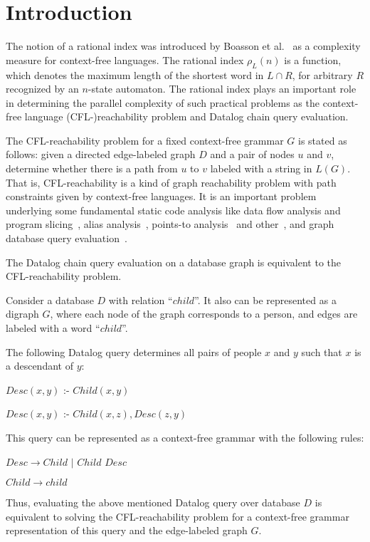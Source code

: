 \documentclass{ws-ijfcs}
\begin{document}

\section{Introduction}
\label{intro}
The notion of a rational index was introduced by Boasson et al.~\cite{RatBasic} as a complexity measure for context-free languages.  The rational index $\rho_L(n)$ is a function, which denotes the maximum length of the shortest word in $L \cap R$, for arbitrary $R$ recognized by an $n$-state automaton. The rational index plays an important role in determining the parallel complexity of such practical problems as the context-free language (CFL-)reachability problem and Datalog chain query evaluation.

The CFL-reachability problem for a fixed context-free grammar $G$ is stated as follows: given a directed edge-labeled graph $D$ and a pair of nodes  $u$ and $v$, determine whether there is a path from $u$ to $v$ labeled with a string in $L(G)$.  That is, CFL-reachability is a kind of graph reachability problem with path constraints given by context-free languages. It is an important problem underlying some fundamental static code analysis like data flow analysis and program slicing~\cite{RepsBasic}, alias analysis~\cite*{Chatterjee, alias}, points-to analysis~\cite{Incremental} and other~\cite{Cai, android, typeflow}, and graph database query evaluation~\cite{Azimov, GrigorevRagozina, HellingsCFPQ, RDF}.  


The Datalog chain query evaluation on a database graph is equivalent to the CFL-reachability problem. 
\begin{example}
\label{DatalogExample}
Consider a database  $D$ with relation ``$child$''. It also can be represented as a digraph $G$, where each node of the graph corresponds to a person, and edges are labeled with a word ``$child$''.


The following Datalog query determines all pairs of people $x$ and $y$ such that $x$ is a descendant of $y$: 


$Desc(x, y)$ :- $Child(x, y)$

$Desc(x, y)$ :- $Child(x, z), Desc(z, y)$


This query can be represented as a context-free grammar with the following rules: 


$Desc \rightarrow Child$ $\vert$ $Child$ $Desc$


$Child  \rightarrow child$


Thus, evaluating the above mentioned Datalog query over database $D$ is equivalent to solving the CFL-reachability problem for a context-free grammar representation of this query and the edge-labeled graph $G$.
\end{example}
\end{document}
